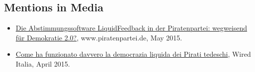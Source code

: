 \documentclass[line,margin]{res}
\begin{document}
\begin{resume}

\section{Mentions in Media}
\begin{itemize}
  \item
    \href{https://www.piratenpartei.de/2015/05/31/die-abstimmungssoftware-liquidfeedback-der-piratenpartei-wegweisend-fuer-demokratie-2-0/}{Die
      Abstimmungssoftware LiquidFeedback in der Piratenpartei:
      wegweisend für Demokratie 2.0?}, www.piratenpartei.de, May 2015. 
\item
  \href{http://www.wired.it/attualita/2015/04/01/come-funzionato-davvero-democrazia-liquida-dei-pirati-tedeschi/}{Come
    ha funzionato davvero la democrazia liquida dei Pirati tedeschi},
  Wired Italia, April 2015. 
\end{itemize}


\end{resume}
\end{document}

